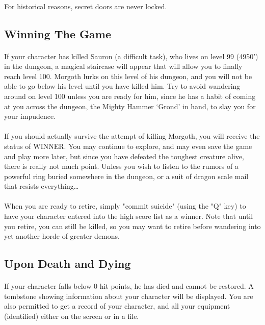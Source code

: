 \paragraph{}For historical reasons, secret doors are never locked.

\subsection{Winning The Game}
\paragraph{}If your character has killed Sauron (a difficult task), who
lives on level 99 (4950') in the dungeon, a magical staircase will
appear that will allow you to finally reach level 100. Morgoth lurks on
this level of his dungeon, and you will not be able to go below his
level until you have killed him.  Try to avoid wandering around on level
100 unless you are ready for him, since he has a habit of coming at you
across the dungeon, the Mighty Hammer `Grond' in hand, to slay you for
your impudence.

\paragraph{}If you should actually survive the attempt of killing
Morgoth, you will receive the status of WINNER. You may continue to
explore, and may even save the game and play more later, but since you
have defeated the toughest creature alive, there is really not much
point. Unless you wish to listen to the rumors of a powerful ring buried
somewhere in the dungeon, or a suit of dragon scale mail that resists
everything\ldots

\paragraph{}When you are ready to retire, simply "commit suicide" (using
the "Q" key) to have your character entered into the high score list as
a winner. Note that until you retire, you can still be killed, so you
may want to retire before wandering into yet another horde of greater
demons.

\subsection{Upon Death and Dying}
\paragraph{}If your character falls below 0 hit points, he has died and
cannot be restored. A tombstone showing information about your character
will be displayed. You are also permitted to get a record of your
character, and all your equipment (identified) either on the screen or
in a file.

